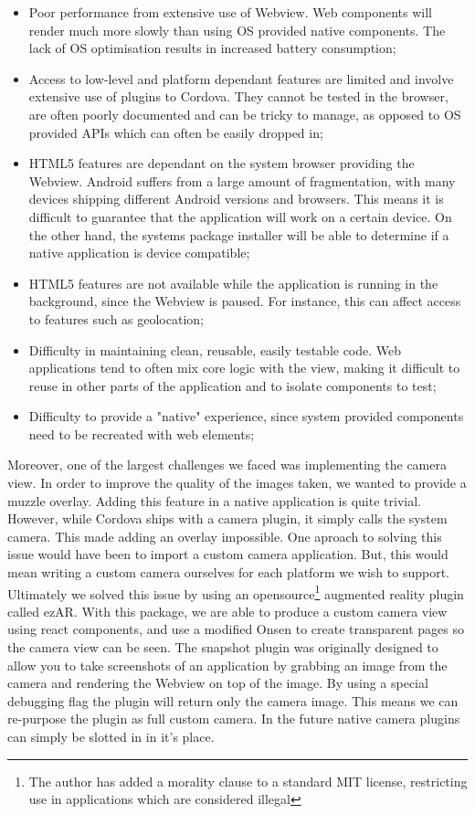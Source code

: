 \begin{itemize}
	\item Poor performance from extensive use of Webview. Web components will render much more slowly than using OS provided native components. The lack of OS optimisation results in increased battery consumption;
	\item Access to low-level and platform dependant features are limited and involve extensive use of plugins to Cordova. They cannot be tested in the browser, are often poorly documented and can be tricky to manage, as opposed to OS provided APIs which can often be easily dropped in;
  \item HTML5 features are dependant on the system browser providing the Webview. Android suffers from a large amount of fragmentation, with many devices shipping different Android versions and browsers. This means it is difficult to guarantee that the application will work on a certain device. On the other hand, the systems package installer will be able to determine if a native application is device compatible;
  \item HTML5 features are not available while the application is running in the background, since the Webview is paused. For instance, this can affect access to features such as geolocation;
	\item Difficulty in maintaining clean, reusable, easily testable code. Web applications tend to often mix core logic with the view, making it difficult to reuse in other parts of the application and to isolate components to test;
	\item Difficulty to provide a "native" experience, since system provided components need to be recreated with web elements;
\end{itemize}

Moreover, one of the largest challenges we faced was implementing the camera view. In order to improve the quality of the images taken, we wanted to provide a muzzle overlay. Adding this feature in a native application is quite trivial. However, while Cordova ships with a camera plugin, it simply calls the system camera. This made adding an overlay impossible. One aproach to solving this issue would have been to import a custom camera application. But, this would mean writing a custom camera ourselves for each platform we wish to support.
Ultimately we solved this issue by using an opensource\footnote{The author has added a morality clause to a standard MIT license, restricting use in applications which are considered illegal} augmented reality plugin called ezAR. With this package, we are able to produce a custom camera view using react components, and use a modified Onsen to create transparent pages so the camera view can be seen. The snapshot plugin was originally designed to allow you to take screenshots of an application by grabbing an image from the camera and rendering the Webview on top of the image. By using a special debugging flag the plugin will return only the camera image. This means we can re-purpose the plugin as full custom camera. In the future native camera plugins can simply be slotted in in it's place.

